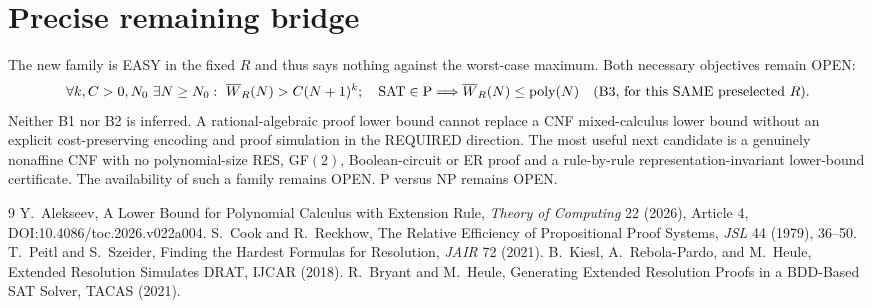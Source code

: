 \documentclass[11pt]{article}
\begin{document}
\section*{Precise remaining bridge}
The new family is EASY in the fixed $R$ and thus says nothing against the worst-case maximum. Both necessary objectives remain OPEN:
\[
\forall k,C>0,N_0\ \exists N\ge N_0:
\ \overline W_R(N)>C(N+1)^k;
\quad
{\rm SAT}\in{\rm P}\Longrightarrow\overline W_R(N)\le\operatorname{poly}(N)
\quad\text{(B3, for this SAME preselected $R$)}.
\]
Neither B1 nor B2 is inferred. A rational-algebraic proof lower bound cannot replace a CNF mixed-calculus lower bound without an explicit cost-preserving encoding and proof simulation in the REQUIRED direction. The most useful next candidate is a genuinely nonaffine CNF with no polynomial-size RES, GF$(2)$, Boolean-circuit or ER proof and a rule-by-rule representation-invariant lower-bound certificate. The availability of such a family remains OPEN. P versus NP remains OPEN.

\begin{thebibliography}{9}
 Y.~Alekseev, A Lower Bound for Polynomial Calculus with Extension Rule, \emph{Theory of Computing} 22 (2026), Article 4, DOI:10.4086/toc.2026.v022a004.
 S.~Cook and R.~Reckhow, The Relative Efficiency of Propositional Proof Systems, \emph{JSL} 44 (1979), 36--50.
 T.~Peitl and S.~Szeider, Finding the Hardest Formulas for Resolution, \emph{JAIR} 72 (2021).
 B.~Kiesl, A.~Rebola-Pardo, and M.~Heule, Extended Resolution Simulates DRAT, IJCAR (2018).
 R.~Bryant and M.~Heule, Generating Extended Resolution Proofs in a BDD-Based SAT Solver, TACAS (2021).
\end{thebibliography}
\end{document}
